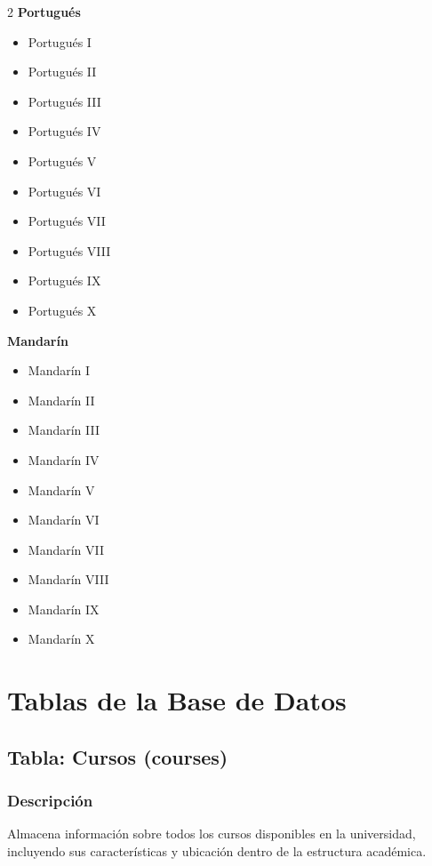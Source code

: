 \documentclass[12pt,a4paper]{article}
\begin{document}
\begin{multicols}{2}
		\textbf{Portugués}
		\begin{itemize}
			\item Portugués I
			\item Portugués II
			\item Portugués III
			\item Portugués IV
			\item Portugués V
			\item Portugués VI
			\item Portugués VII
			\item Portugués VIII
			\item Portugués IX
			\item Portugués X
		\end{itemize}
		
		\textbf{Mandarín}
		\begin{itemize}
			\item Mandarín I
			\item Mandarín II
			\item Mandarín III
			\item Mandarín IV
			\item Mandarín V
			\item Mandarín VI
			\item Mandarín VII
			\item Mandarín VIII
			\item Mandarín IX
			\item Mandarín X
		\end{itemize}
	\end{multicols}
	
	\newpage
	
	\section{Tablas de la Base de Datos}
	
	\subsection{Tabla: Cursos (courses)}
	
	\subsubsection{Descripción}
	Almacena información sobre todos los cursos disponibles en la universidad, incluyendo sus características y ubicación dentro de la estructura académica.
	
\end{document}
